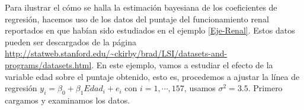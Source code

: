 \begin{Eje}\label{renal_varianza_conocida}
Para ilustrar el cómo se halla la estimación bayesiana de los coeficientes de regresión, hacemos uso de los datos del puntaje del funcionamiento renal reportados en  que habían sido estudiados en el ejemplo \ref{Eje-Renal}. Estos datos pueden ser descargados de la página \url{http://statweb.stanford.edu/~ckirby/brad/LSI/datasets-and-programs/datasets.html}. En este ejemplo, vamos a estudiar el efecto de la variable edad sobre el puntaje obtenido, esto es, procedemos a ajustar la línea de regresión $y_i=\beta_0+\beta_1Edad_i+e_i$ con $i=1,\cdots,157$, usamos $\sigma^2=3.5$. Primero cargamos y examinamos los datos.
\begin{knitrout}
\color{fgcolor}\begin{kframe}
\begin{alltt}
\hlstd{(}\hlstd{)}
\hlstd{(}\hlstd{)}
\end{alltt}



\end{kframe}
\end{knitrout}
\end{Eje}
